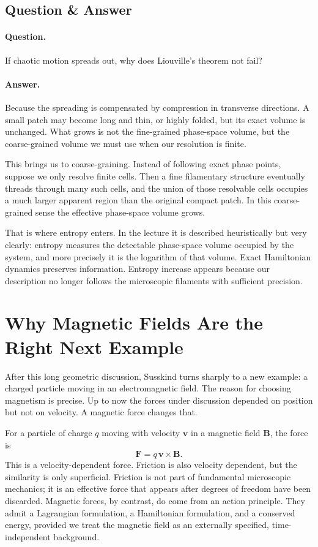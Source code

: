 \subsection{Question \& Answer}

\paragraph{Question.} If chaotic motion spreads out, why does Liouville's theorem not fail?

\paragraph{Answer.} Because the spreading is compensated by compression in transverse directions. A small patch may become long and thin, or highly folded, but its exact volume is unchanged. What grows is not the fine-grained phase-space volume, but the coarse-grained volume we must use when our resolution is finite.

This brings us to coarse-graining. Instead of following exact phase points, suppose we only resolve finite cells. Then a fine filamentary structure eventually threads through many such cells, and the union of those resolvable cells occupies a much larger apparent region than the original compact patch. In this coarse-grained sense the effective phase-space volume grows.

That is where entropy enters. In the lecture it is described heuristically but very clearly: entropy measures the detectable phase-space volume occupied by the system, and more precisely it is the logarithm of that volume. Exact Hamiltonian dynamics preserves information. Entropy increase appears because our description no longer follows the microscopic filaments with sufficient precision.

\section{Why Magnetic Fields Are the Right Next Example}

After this long geometric discussion, Susskind turns sharply to a new example: a charged particle moving in an electromagnetic field. The reason for choosing magnetism is precise. Up to now the forces under discussion depended on position but not on velocity. A magnetic force changes that.

For a particle of charge \(q\) moving with velocity \(\mathbf v\) in a magnetic field \(\mathbf B\), the force is
\begin{equation}
\mathbf F = q\,\mathbf v\times \mathbf B.
\end{equation}
This is a velocity-dependent force. Friction is also velocity dependent, but the similarity is only superficial. Friction is not part of fundamental microscopic mechanics; it is an effective force that appears after degrees of freedom have been discarded. Magnetic forces, by contrast, do come from an action principle. They admit a Lagrangian formulation, a Hamiltonian formulation, and a conserved energy, provided we treat the magnetic field as an externally specified, time-independent background.

